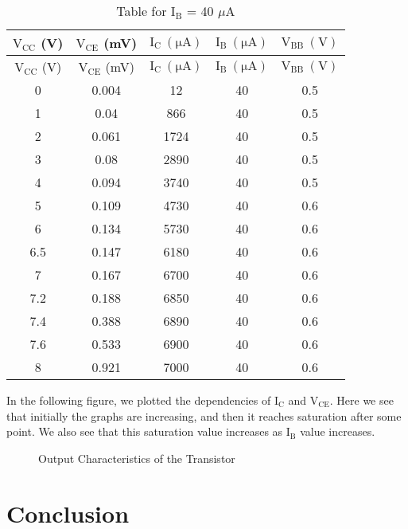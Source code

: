 \documentclass[12pt]{article}
\begin{document}
\begin{longtable}[H]{|c|c|c|c|c|}
    \caption{Table for \( \mathrm{I_B}\) = 40 \( \mu \)A }
    \endfirsthead
    \hline
    $\mathrm{V_{CC}}$ (V) & $\mathrm{V_{CE}}$ (mV) & $\mathrm{I_C \ (\mu A)}$ & $\mathrm{I_B \ (\mu A)}$ & $\mathrm{V_{BB} \ (V)}$ \\ \hline \hline
    \endhead 
    \hline
    $\mathrm{V_{CC}}$ (V) & $\mathrm{V_{CE}}$ (mV) & $\mathrm{I_C \ (\mu A)}$ & $\mathrm{I_B \ (\mu A)}$ & $\mathrm{V_{BB} \ (V)}$ \\ \hline \hline
        0     & 0.004         & 12           & 40           & 0.5   \\  \hline
        1     & 0.04          & 866          & 40           & 0.5   \\  \hline
        2     & 0.061         & 1724         & 40           & 0.5   \\  \hline
        3     & 0.08          & 2890         & 40           & 0.5   \\  \hline
        4     & 0.094         & 3740         & 40           & 0.5   \\  \hline
        5     & 0.109         & 4730         & 40           & 0.6   \\  \hline
        6     & 0.134         & 5730         & 40           & 0.6   \\  \hline
        6.5   & 0.147         & 6180         & 40           & 0.6   \\  \hline
        7     & 0.167         & 6700         & 40           & 0.6   \\  \hline
        7.2   & 0.188         & 6850         & 40           & 0.6   \\  \hline
        7.4   & 0.388         & 6890         & 40           & 0.6   \\  \hline
        7.6   & 0.533         & 6900         & 40           & 0.6   \\  \hline
        8     & 0.921         & 7000         & 40           & 0.6   \\ \hline
\end{longtable}

In the following figure, we plotted the dependencies of $\mathrm{I_C}$ and $\mathrm{V_{CE}}$. Here we see that initially the graphs are increasing, and then it reaches saturation after some point. We also see that this saturation value increases as \( \mathrm{I_B }\) value increases.
\begin{figure}[H]
    \centering
    
    \caption{Output Characteristics of the Transistor}
\end{figure}
   
\section{Conclusion}
\end{document}
